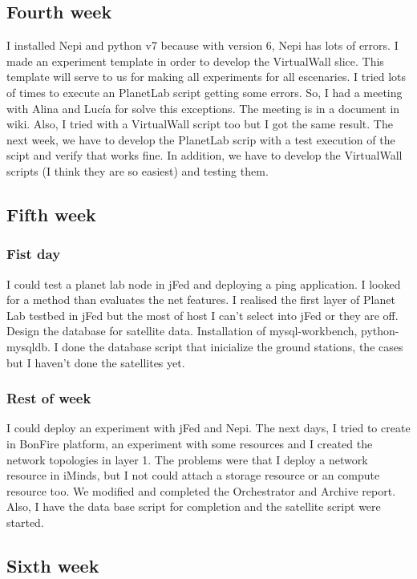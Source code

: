 \subsection{Fourth week}
I installed Nepi\cite{Nepi} and python v7 because with version 6, Nepi has lots of errors.
I made an experiment template in order to develop the VirtualWall slice. This template will serve to us for making all experiments for all escenaries.
I tried lots of times to execute an PlanetLab\cite{PLE} script getting some errors. So, I had a meeting with Alina and Lucía for solve this exceptions.
The meeting is in a document in wiki.
Also, I tried with a VirtualWall script too but I got the same result.
The next week, we have to develop the PlanetLab scrip with a test execution of the scipt and verify that works fine.
In addition, we have to develop the VirtualWall scripts (I think they are so easiest) and testing them.

\subsection{Fifth week}
\subsubsection{Fist day}

I could test a planet lab node in jFed and deploying a ping application.
I looked for a method than evaluates the net features.
I realised the first layer of Planet Lab testbed in jFed but the most of host I can't select into jFed or they are off.
Design the database for satellite data.
Installation of mysql-workbench, python-mysqldb.
I done the database script that inicialize the ground stations, the cases but I haven't done the satellites yet.


\subsubsection{Rest of week}
I could deploy an experiment with jFed and Nepi.
The next days, I tried to create in BonFire platform, an experiment with some resources and I created the network topologies in layer 1. The problems were that I deploy a network resource in iMinds, but I not could attach a storage resource or an compute resource too.
We modified and completed the Orchestrator and Archive report.
Also, I have the data base script for completion and the satellite script were started.

\subsection{Sixth week}

